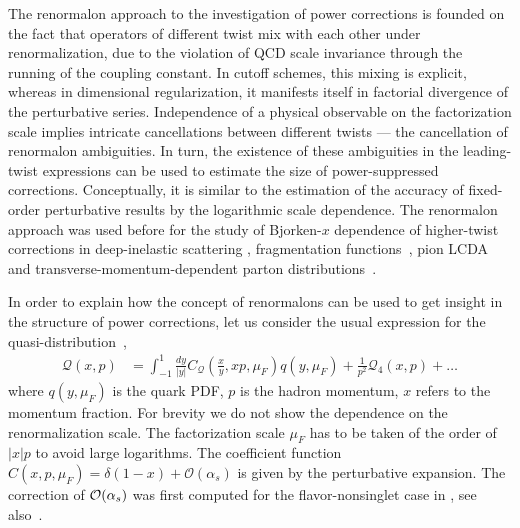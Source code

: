\documentclass[aps,prd,twocolumn,a4paper,superscriptaddress,10pt,showpacs,notitlepage,floatfix]{revtex4-1}
\newcommand{\Qd}{\!\scriptscriptstyle \mathcal{Q}}
\begin{document}
The renormalon approach to the investigation of power corrections is founded on the fact that operators of different twist mix with each other under renormalization, due to the violation of QCD scale invariance through the running of the coupling constant. In cutoff schemes, this mixing is explicit, whereas in dimensional regularization, it manifests itself in factorial divergence of the perturbative series. Independence of a physical observable on the factorization scale implies intricate cancellations between different twists --- the cancellation of renormalon ambiguities. In turn, the existence of these ambiguities in the leading-twist expressions can be used to estimate the size of power-suppressed corrections. Conceptually, it is similar to the estimation of the accuracy of fixed-order perturbative results by the logarithmic scale dependence. The renormalon approach was used before for the study of Bjorken-$x$ dependence of higher-twist corrections in deep-inelastic scattering \cite{Beneke:1995pq,Dokshitzer:1995qm,Dasgupta:1996hh}, fragmentation functions~\cite{Dasgupta:1996ki,Beneke:1997sr}, pion LCDA~\cite{Braun:2004bu} and transverse-momentum-dependent parton distributions~\cite{Scimemi:2016ffw}.

In order to explain how the concept of renormalons can be used to get insight in the structure of power corrections, let us
consider the usual expression for the quasi-distribution~\cite{Ji:2015qla,Izubuchi:2018srq}, 
\begin{align}
\label{qPDF1}
 \mathcal{Q}(x,p) &= \int_{-1}^1 \!\frac{dy}{|y|} C_{\Qd}(\tfrac{x}{y},xp,\mu_F) q(y,\mu_F) + \frac{1}{p^2}  \mathcal{Q}_4(x,p) + \ldots
\end{align}
where $q(y,\mu_F)$ is the quark PDF, $p$ is the hadron momentum, $x$ refers to the momentum fraction. For brevity we do not show the dependence on the renormalization scale. The factorization scale $\mu_F$ has to be taken of the order of $|x| p$ to avoid large logarithms.  The coefficient function $C(x,p,\mu_F) = \delta(1-x) + \mathcal{O}(\alpha_s)$ is given by the perturbative expansion. The correction of ${\cal O}(\alpha_s)$ was first computed for the flavor-nonsinglet case in \cite{Xiong:2013bka}, see also~\cite{Stewart:2017tvs}. 
\end{document}
